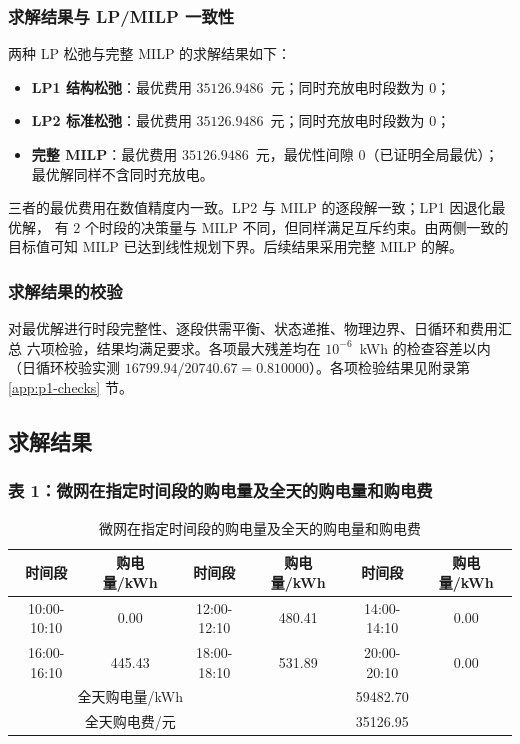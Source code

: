 \documentclass[withoutpreface,bwprint]{cumcmthesis}
\begin{document}
\subsubsection{求解结果与 LP/MILP 一致性}

两种 LP 松弛与完整 MILP 的求解结果如下：

\begin{itemize}
  \item \textbf{LP1 结构松弛}：最优费用 $35126.9486$~元；同时充放电时段数为 $0$；
  \item \textbf{LP2 标准松弛}：最优费用 $35126.9486$~元；同时充放电时段数为 $0$；
  \item \textbf{完整 MILP}：最优费用 $35126.9486$~元，最优性间隙
        $0$（已证明全局最优）；最优解同样不含同时充放电。
\end{itemize}

三者的最优费用在数值精度内一致。LP2 与 MILP 的逐段解一致；LP1 因退化最优解，
有 $2$ 个时段的决策量与 MILP 不同，但同样满足互斥约束。由两侧一致的目标值可知
MILP 已达到线性规划下界。后续结果采用完整 MILP 的解。

\subsubsection{求解结果的校验}

对最优解进行时段完整性、逐段供需平衡、状态递推、物理边界、日循环和费用汇总
六项检验，结果均满足要求。各项最大残差均在
$10^{-6}$~kWh 的检查容差以内（日循环校验实测
$16799.94/20740.67=0.810000$）。各项检验结果见附录第 \ref{app:p1-checks} 节。
\subsection{求解结果}

\subsubsection{表 1：微网在指定时间段的购电量及全天的购电量和购电费}

\begin{table}[htbp]
  \centering
  \caption{微网在指定时间段的购电量及全天的购电量和购电费}
  \label{tab:p1-buy}
  \begin{tabular}{cccccc}
    \toprule
    时间段 & 购电量/kWh & 时间段 & 购电量/kWh & 时间段 & 购电量/kWh \\
    \midrule
    10:00-10:10 & 0.00 & 12:00-12:10 & 480.41 & 14:00-14:10 & 0.00 \\
    16:00-16:10 & 445.43 & 18:00-18:10 & 531.89 & 20:00-20:10 & 0.00 \\
    \midrule
    \multicolumn{3}{c}{全天购电量/kWh} & \multicolumn{3}{c}{59482.70} \\
    \multicolumn{3}{c}{全天购电费/元}   & \multicolumn{3}{c}{35126.95} \\
    \bottomrule
  \end{tabular}
\end{table}
\end{document}
